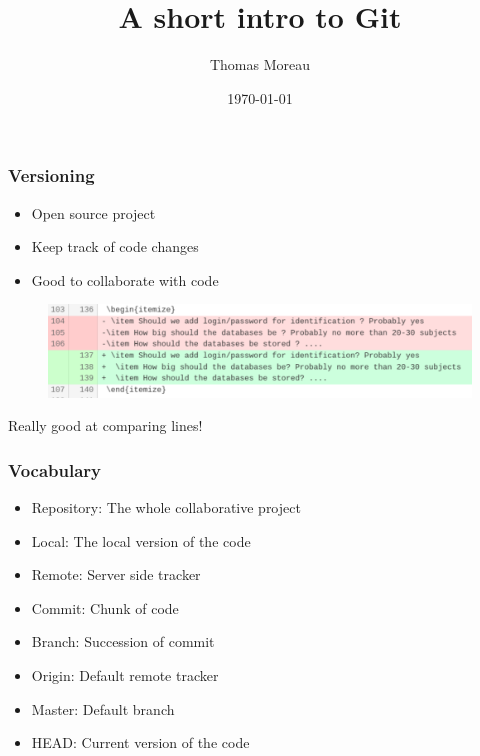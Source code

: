 \documentclass{beamer}
\title[Git]{A short intro to Git} %
\author{Thomas Moreau} %
\institute[CMLA] %
{
Centre de mathématiques et de leur applications \\ %
ENS Cachan\\
\medskip
\textit{thomas.moreau@cmla.ens-cachan.fr} %
}
\date{\today} %
\begin{document}
\begin{frame}
\titlepage %
\end{frame}



\begin{frame}
\frametitle{Versioning}
\begin{itemize}
\item Open source project
\item Keep track of code changes
\item Good to collaborate with code
\end{itemize}
\begin{figure}[htp]
\centering
\includegraphics[width=\textwidth]{diff.png}
\label{}
\end{figure}

\centering
Really good at comparing lines!

\end{frame}


\begin{frame}
	\frametitle{Vocabulary}
	\begin{itemize}
    	\item Repository: The whole collaborative project
    	\item Local: The local version of the code
    	\item Remote: Server side tracker
    	\item Commit: Chunk of code
    	\item Branch: Succession of commit
    	\item Origin: Default remote tracker
    	\item Master: Default branch
    	\item HEAD:   Current version of the code
    \end{itemize}
\end{frame}
\end{document}
